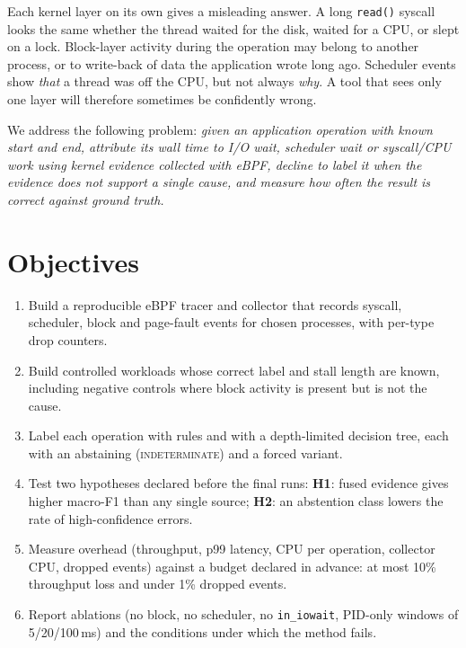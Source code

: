 \documentclass[conference]{IEEEtran}
\newcommand{\lbl}[1]{\textsc{#1}}
\newcommand{\IND}{\lbl{indeterminate}}
\begin{document}
Each kernel layer on its own gives a misleading answer. A long \texttt{read()} syscall looks the same whether the thread waited for the disk, waited for a CPU, or slept on a lock. Block-layer activity during the operation may belong to another process, or to write-back of data the application wrote long ago. Scheduler events show \emph{that} a thread was off the CPU, but not always \emph{why}. A tool that sees only one layer will therefore sometimes be confidently wrong.

We address the following problem: \emph{given an application operation with known start and end, attribute its wall time to I/O wait, scheduler wait or syscall/CPU work using kernel evidence collected with eBPF, decline to label it when the evidence does not support a single cause, and measure how often the result is correct against ground truth.}

\section{Objectives}
\begin{enumerate}
\item Build a reproducible eBPF tracer and collector that records syscall, scheduler, block and page-fault events for chosen processes, with per-type drop counters.
\item Build controlled workloads whose correct label and stall length are known, including negative controls where block activity is present but is not the cause.
\item Label each operation with rules and with a depth-limited decision tree, each with an abstaining (\IND) and a forced variant.
\item Test two hypotheses declared before the final runs:
  \textbf{H1}: fused evidence gives higher macro-F1 than any single source;
  \textbf{H2}: an abstention class lowers the rate of high-confidence errors.
\item Measure overhead (throughput, p99 latency, CPU per operation, collector CPU, dropped events) against a budget declared in advance: at most 10\% throughput loss and under 1\% dropped events.
\item Report ablations (no block, no scheduler, no \texttt{in\_iowait}, PID-only windows of 5/20/100\,ms) and the conditions under which the method fails.
\end{enumerate}
\end{document}
